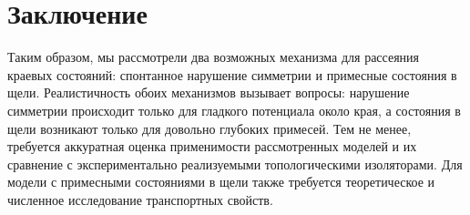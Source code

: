 \section{Заключение}
Таким образом, мы рассмотрели два возможных механизма для рассеяния краевых состояний:
спонтанное нарушение симметрии и примесные состояния в щели. Реалистичность обоих механизмов
вызывает вопросы: нарушение симметрии происходит только для гладкого потенциала 
около края, а состояния в щели возникают только для довольно глубоких 
примесей. Тем не менее, требуется аккуратная оценка применимости рассмотренных моделей и
их сравнение с экспериментально реализуемыми топологическими изоляторами. Для модели 
с примесными состояниями в щели также требуется теоретическое и численное исследование
транспортных свойств.
